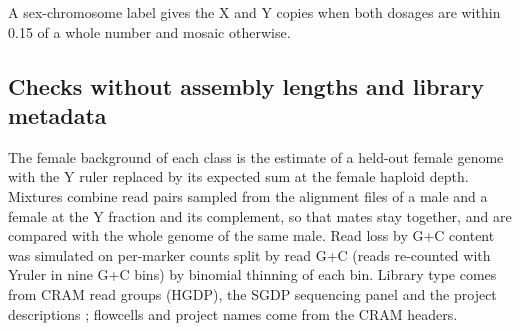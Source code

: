  A sex-chromosome label gives the X and Y copies when both dosages are within 0.15 of a whole number and mosaic otherwise.

\subsection{Checks without assembly lengths and library metadata}\label{sec:m-truthfree}
The female background of each class is the estimate of a held-out female genome with the Y ruler replaced by its expected sum at the female haploid depth. Mixtures combine read pairs sampled from the alignment files of a male and a female at the Y fraction and its complement, so that mates stay together, and are compared with the whole genome of the same male. Read loss by G+C content was simulated on per-marker counts split by read G+C (reads re-counted with Yruler in nine G+C bins) by binomial thinning of each bin. Library type comes from CRAM read groups (HGDP), the SGDP sequencing panel and the project descriptions \cite{Bergstrom2020,Mallick2016,ByrskaBishop2022}; flowcells and project names come from the CRAM headers.

